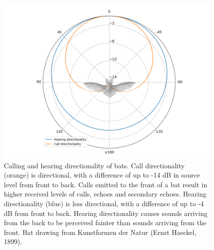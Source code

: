 \documentclass[
]{book}
\begin{document}
\begin{figure}
\includegraphics[]{original_papers/CPN_figures/Figures_SI/Figure_S3.png}
\centering
\caption{Calling and hearing directionality of bats. Call directionality (orange) is directional, with a difference of up to -14 dB in source level from front to back. Calls emitted to the front of a bat result in higher received levels of calls, echoes and secondary echoes. Hearing directionality (blue) is less directional, with a difference of up to -4 dB from front to back. Hearing directionality causes sounds arriving from the back to be perceived fainter than sounds arriving from the front. Bat drawing from Kunstformen der Natur (Ernst Haeckel, 1899).}
\label{cpn_figS3}
\end{figure}

\newpage
\end{document}
